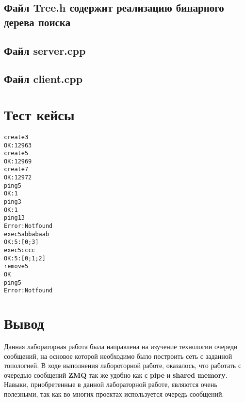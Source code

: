 \subsection*{Файл Tree.h содержит реализацию бинарного дерева поиска}

\subsection*{Файл server.cpp}

\subsection*{Файл client.cpp}

\pagebreak

\section*{Тест кейсы}

\begin{alltt}
create 3
OK: 12963
create 5
OK: 12969
create 7
OK: 12972
ping 5
OK: 1
ping 3
OK: 1
ping 13
Error: Not found
exec 5 abbaba ab
OK:5: [0; 3]
exec 5 ccc c
OK:5: [0; 1; 2]
remove 5
OK
ping 5
Error: Not found

\end{alltt}

\newpage

\section*{Вывод}

 Данная лабораторная работа была направлена на изучение технологии очереди сообщений, на основое которой необходимо было построить сеть с заданной топологией. В ходе выполнения лабороторной работе, оказалось, что работать с очередью сообщений \textbf{ZMQ} так же удобно как с \textbf{pipe} и \textbf{shared memory}. Навыки, приобретенные в данной лабораторной работе, являются очень полезными, так как во многих проектах используется очередь сообщений. 

